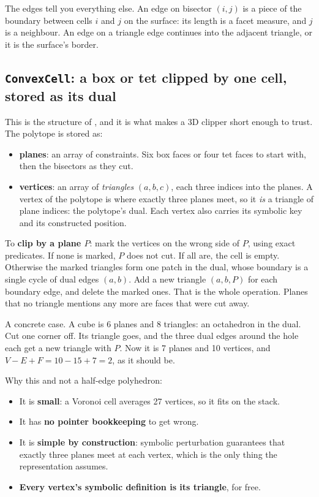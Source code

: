 \documentclass[11pt,a4paper]{article}
\newcommand{\code}[1]{\texttt{#1}}          %
\begin{document}
The edges tell you everything else. An edge on bisector $(i,j)$ is a piece of the boundary
between cells $i$ and $j$ on the surface: its length is a facet measure, and $j$ is a neighbour.
An edge on a triangle edge continues into the adjacent triangle, or it is the surface's border.

\subsection{\texorpdfstring{\code{ConvexCell}}{ConvexCell}: a box or tet clipped by one cell, stored as its dual}\label{ssec:convexcell}

This is the structure of \citet{ray2018}, and it is what makes a 3D clipper short enough to
trust. The polytope is stored as:

\begin{itemize}
\item \textbf{planes}: an array of constraints. Six box faces or four tet faces to start with,
  then the bisectors as they cut.
\item \textbf{vertices}: an array of \emph{triangles} $(a, b, c)$, each three indices into the
  planes. A vertex of the polytope is where exactly three planes meet, so it \emph{is} a triangle
  of plane indices: the polytope's dual. Each vertex also carries its symbolic key and its
  constructed position.
\end{itemize}

To \textbf{clip by a plane $P$}: mark the vertices on the wrong side of $P$, using exact
predicates. If none is marked, $P$ does not cut. If all are, the cell is empty. Otherwise the
marked triangles form one patch in the dual, whose boundary is a single cycle of dual edges
$(a,b)$. Add a new triangle $(a, b, P)$ for each boundary edge, and delete the marked ones. That
is the whole operation. Planes that no triangle mentions any more are faces that were cut away.

A concrete case. A cube is 6 planes and 8 triangles: an octahedron in the dual. Cut one corner
off. Its triangle goes, and the three dual edges around the hole each get a new triangle with
$P$. Now it is 7 planes and 10 vertices, and $V - E + F = 10 - 15 + 7 = 2$, as it should be.

Why this and not a half-edge polyhedron:

\begin{itemize}
\item It is \textbf{small}: a Voronoi cell averages 27 vertices, so it fits on the stack.
\item It has \textbf{no pointer bookkeeping} to get wrong.
\item It is \textbf{simple by construction}: symbolic perturbation guarantees that exactly three
  planes meet at each vertex, which is the only thing the representation assumes.
\item \textbf{Every vertex's symbolic definition is its triangle}, for free.
\end{itemize}
\end{document}
